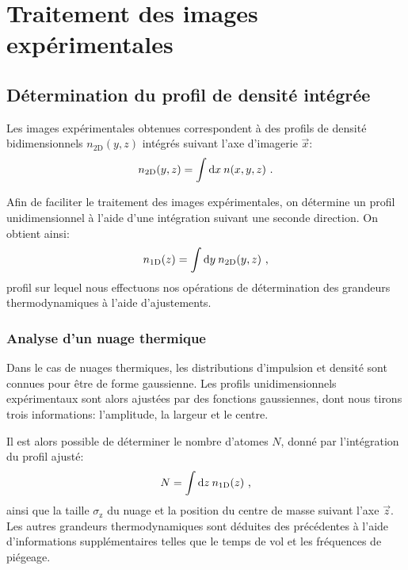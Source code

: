 \chapter{Traitement des images expérimentales}
\label{ch:anex_mesure_temp}

\section{Détermination du profil de densité intégrée}

Les images expérimentales obtenues correspondent à des profils de densité bidimensionnels $n_{\mathrm{2D}}(y,z)$ intégrés suivant l'axe d'imagerie $\vec{x}$:
\begin{equation}
n_{\mathrm{2D}}(y,z)=\int{\mathop{}\mathopen{}\mathrm{d}x \: n(x,y,z)} \text{ .}
\end{equation}

Afin de faciliter le traitement des images expérimentales, on détermine un profil unidimensionnel à l'aide d'une intégration suivant une seconde direction. On obtient ainsi: 
\begin{equation}
n_{\mathrm{1D}}(z)=\int{\mathop{}\mathopen{}\mathrm{d}y \: n_{\mathrm{2D}}(y,z)} \text{ ,}
\end{equation}
profil sur lequel nous effectuons nos opérations de détermination des grandeurs thermodynamiques à l'aide d'ajustements.

\subsection{Analyse d'un nuage thermique}
Dans le cas de nuages thermiques, les distributions d'impulsion et densité sont connues pour être de forme gaussienne. Les profils unidimensionnels expérimentaux sont alors ajustées par des fonctions gaussiennes, dont nous tirons trois informations: l'amplitude, la largeur et le centre. 

Il est alors possible de déterminer le nombre d'atomes $N$, donné par l'intégration du profil ajusté:  
\begin{equation}
N=\int{\mathop{}\mathopen{}\mathrm{d}z \: n_{\mathrm{1D}}(z)} \text{ ,}
\end{equation}
ainsi que la taille $\sigma_{\mathrm{z}}$ du nuage et la position du centre de masse suivant l'axe $\vec{z}$. Les autres grandeurs thermodynamiques sont déduites des précédentes à l'aide d'informations supplémentaires telles que le temps de vol et les fréquences de piégeage. 

